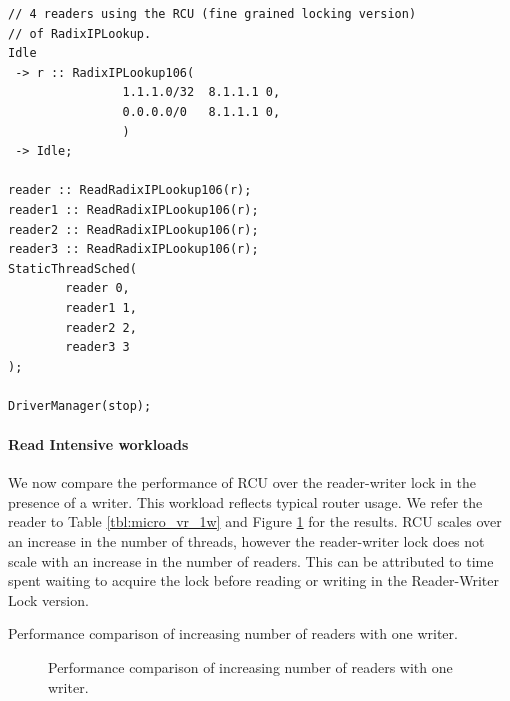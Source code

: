 \documentclass[a4paper,marginparwidth=50pt,marginparsep=10pt]{article}
\begin{document}
\begin{lstlisting}[float=tph, caption = A Click configuration file for 4 readers, label =lst:readercomparison]
// 4 readers using the RCU (fine grained locking version)
// of RadixIPLookup.
Idle
 -> r :: RadixIPLookup106(
                1.1.1.0/32  8.1.1.1 0,
                0.0.0.0/0   8.1.1.1 0,
                ) 
 -> Idle;

reader :: ReadRadixIPLookup106(r);
reader1 :: ReadRadixIPLookup106(r);
reader2 :: ReadRadixIPLookup106(r);
reader3 :: ReadRadixIPLookup106(r);
StaticThreadSched(
        reader 0,
        reader1 1,
        reader2 2,
        reader3 3
);

DriverManager(stop);

\end{lstlisting}

\paragraph{Read Intensive workloads}
We now compare the performance of RCU over the reader-writer lock in the presence of a writer. This workload reflects typical router usage. We refer the reader to Table \ref{tbl:micro_vr_1w} and Figure \ref{img:micro_vr_1w} for the results.
RCU scales over an increase in the number of threads, however the reader-writer lock does not scale with an increase in the number of readers. This can be attributed to time spent waiting to acquire the lock before reading or writing in the Reader-Writer Lock version.

\begin{table}[tph]
\begin{center}

\end{center}
\label{tbl:micro_vr_1w}
\caption{Performance comparison of increasing number of readers with one writer.}
\end{table}

\begin{figure}[tph]
\begin{center}
\caption{Performance comparison of increasing number of readers with one writer.}
\label{img:micro_vr_1w}
\end{center}
\end{figure}
\end{document}
